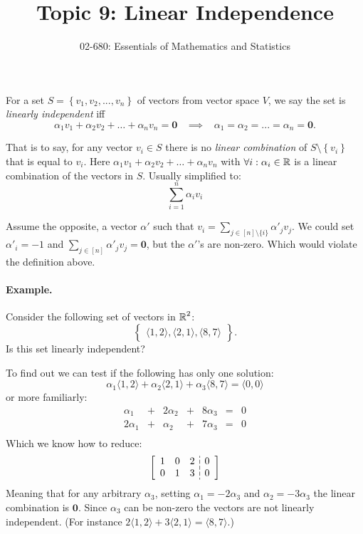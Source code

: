 


\title{Topic 9: Linear Independence}
\author{02-680: Essentials of Mathematics and Statistics}


\maketitle

For a set $S=\left\{v_1,v_2,...,v_n\right\}$ of vectors from vector space $V$, 
we say the set is \emph{linearly independent} iff 
\[
\alpha_1v_1 + \alpha_2v_2 + \hdots + \alpha_nv_n = \mathbf{0} \;\;\;\implies\;\;\; \alpha_1=\alpha_2=...=\alpha_n = \mathbf{0}.
\]

That is to say, for any vector $v_i\in S$ there is no \emph{linear combination} of $S\setminus\left\{v_i\right\}$ that is equal to $v_i$. 
Here $\alpha_1v_1 + \alpha_2v_2 + \hdots + \alpha_nv_n$ with $\forall i: \alpha_i\in\operatorname{\mathbb{R}}$ is a linear combination of the vectors in $S$.
Usually simplified to:  \[\sum_{i=1}^n \alpha_iv_i\]

Assume the opposite, a vector $\alpha'$ such that $v_i = \sum_{j\in [n]\setminus\{i\}}\alpha'_jv_j$. 
We could set $\alpha'_i=-1$
and $\sum_{j\in [n]}\alpha'_jv_j=\mathbf{0}$, but the $\alpha'$'s are non-zero. 
Which would violate the definition above.

\paragraph{Example.} Consider the following set of vectors in $\operatorname{\mathbb{R}}^2$:
\[\left\{\begin{matrix}
\langle1,2\rangle,
\langle2,1\rangle,
\langle8,7\rangle
\end{matrix}\right\}.\]
Is this set linearly independent? 

To find out we can test if the following has only one solution: 
\[\alpha_1 \langle1,2\rangle +
\alpha_2 \langle2,1\rangle +
\alpha_3 \langle8,7\rangle =
\langle0,0\rangle\]
or more familiarly: 
\[
\begin{array}{rcrcrcr}
\alpha_1 & + & 2\alpha_2 & + & 8 \alpha_3 & = & 0\\
2\alpha_1 & + & \alpha_2 & + & 7 \alpha_3 & = & 0\\
\end{array}
\]
Which we know how to reduce: 
\[
\left[
\begin{array}{ccc;{4pt/2pt}c}
1 & 0 & 2 & 0\\
0 & 1 & 3 & 0\\
\end{array}
\right]
\]
Meaning that for any arbitrary $\alpha_3$, setting $\alpha_1 = -2\alpha_3$ and $\alpha_2 = -3\alpha_3$ the linear combination is $\mathbf{0}$. 
Since $\alpha_3$ can be non-zero the vectors are not linearly independent. 
(For instance $2 \langle1,2\rangle +
3 \langle2,1\rangle=
 \langle8,7\rangle$.)



